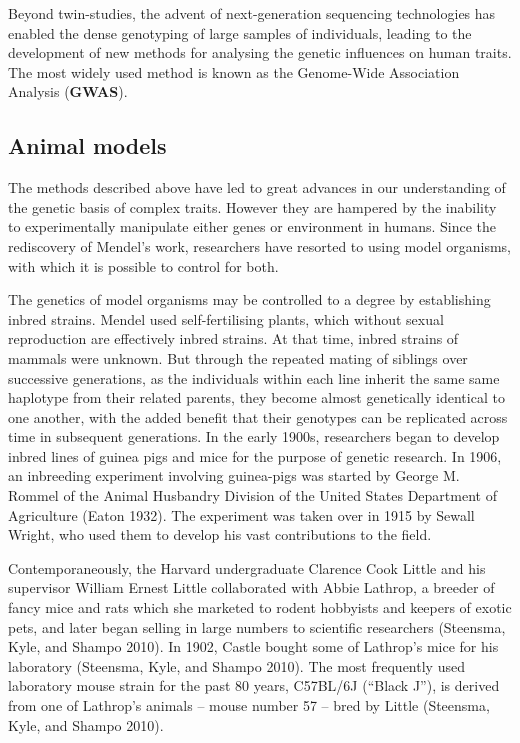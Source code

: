 \documentclass[
]{book}
\begin{document}
Beyond twin-studies, the advent of next-generation sequencing technologies has enabled the dense genotyping of large samples of individuals, leading to the development of new methods for analysing the genetic influences on human traits. The most widely used method is known as the Genome-Wide Association Analysis (\textbf{GWAS}).

\hypertarget{animal-models}{%
\subsection{Animal models}\label{animal-models}}

The methods described above have led to great advances in our understanding of the genetic basis of complex traits. However they are hampered by the inability to experimentally manipulate either genes or environment in humans. Since the rediscovery of Mendel's work, researchers have resorted to using model organisms, with which it is possible to control for both.

The genetics of model organisms may be controlled to a degree by establishing inbred strains. Mendel used self-fertilising plants, which without sexual reproduction are effectively inbred strains. At that time, inbred strains of mammals were unknown. But through the repeated mating of siblings over successive generations, as the individuals within each line inherit the same same haplotype from their related parents, they become almost genetically identical to one another, with the added benefit that their genotypes can be replicated across time in subsequent generations.
In the early 1900s, researchers began to develop inbred lines of guinea pigs and mice for the purpose of genetic research. In 1906, an inbreeding experiment involving guinea-pigs was started by George M. Rommel of the Animal Husbandry Division of the United States Department of Agriculture (Eaton 1932). The experiment was taken over in 1915 by Sewall Wright, who used them to develop his vast contributions to the field.

Contemporaneously, the Harvard undergraduate Clarence Cook Little and his supervisor William Ernest Little collaborated with Abbie Lathrop, a breeder of fancy mice and rats which she marketed to rodent hobbyists and keepers of exotic pets, and later began selling in large numbers to scientific researchers (Steensma, Kyle, and Shampo 2010). In 1902, Castle bought some of Lathrop's mice for his laboratory (Steensma, Kyle, and Shampo 2010). The most frequently used laboratory mouse strain for the past 80 years, C57BL/6J (``Black J''), is derived from one of Lathrop's animals -- mouse number 57 -- bred by Little (Steensma, Kyle, and Shampo 2010).
\end{document}
